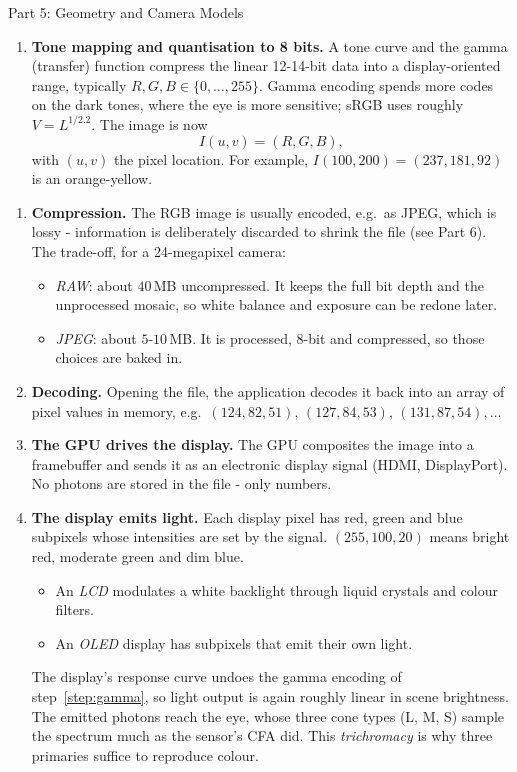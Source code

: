 \documentclass[letterpaper]{article}
\begin{document}
\begin{notes}{Part 5: Geometry and Camera Models}
\begin{enumerate}[resume=steps]
    $M$ is calibrated per sensor model, typically by photographing a colour chart. Each of its rows sums to $1$, so neutral greys stay neutral.
    \item\label{step:gamma} \textbf{Tone mapping and quantisation to 8 bits.} A tone curve and the gamma (transfer) function compress the linear 12-14-bit data into a display-oriented range, typically $R,G,B\in\{0,\ldots,255\}$. Gamma encoding spends more codes on the dark tones, where the eye is more sensitive; sRGB uses roughly $V = L^{1/2.2}$. The image is now
    $$I(u,v) = (R,G,B),$$
    with $(u,v)$ the pixel location. For example, $I(100,200)=(237,181,92)$ is an orange-yellow.
\end{enumerate}


\begin{enumerate}[resume=steps]
    \item \textbf{Compression.} The RGB image is usually encoded, e.g.\ as JPEG, which is lossy - information is deliberately discarded to shrink the file (see Part 6). The trade-off, for a 24-megapixel camera:
    \begin{itemize}[noitemsep]
        \item \emph{RAW}: about $40$\,MB uncompressed. It keeps the full bit depth and the unprocessed mosaic, so white balance and exposure can be redone later.
        \item \emph{JPEG}: about $5$-$10$\,MB. It is processed, 8-bit and compressed, so those choices are baked in.
    \end{itemize}
    \item \textbf{Decoding.} Opening the file, the application decodes it back into an array of pixel values in memory, e.g.\ $(124,82,51),\,(127,84,53),\,(131,87,54),\ldots$
    \item \textbf{The GPU drives the display.} The GPU composites the image into a framebuffer and sends it as an electronic display signal (HDMI, DisplayPort). No photons are stored in the file - only numbers.
    \item \textbf{The display emits light.} Each display pixel has red, green and blue subpixels whose intensities are set by the signal. $(255,100,20)$ means bright red, moderate green and dim blue.
    \begin{itemize}[noitemsep]
        \item An \emph{LCD} modulates a white backlight through liquid crystals and colour filters.
        \item An \emph{OLED} display has subpixels that emit their own light.
    \end{itemize}
    The display's response curve undoes the gamma encoding of step~\ref{step:gamma}, so light output is again roughly linear in scene brightness. The emitted photons reach the eye, whose three cone types (L, M, S) sample the spectrum much as the sensor's CFA did. This \emph{trichromacy} is why three primaries suffice to reproduce colour.
\end{enumerate}


\end{notes}
\end{document}
